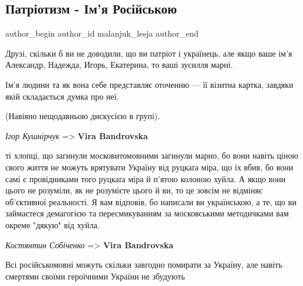  
 
 
 
 
 
\subsection{Патріотизм - Ім'я Російською}
\label{sec:12_10_2019.fb.malanjuk_lesja.1.patriotizm_imja_jazyk}
 
\ifcmt
 author_begin
   author_id malanjuk_lesja
 author_end
\fi

Друзі, скільки б ви не доводили, що ви патріот і українець, але якщо ваше ім'я
Александр, Надежда, Игорь, Екатерина, то ваші зусилля марні.

Ім'я людини та як вона себе представляє оточенню — її візитна картка, завдяки
якій складається думка про неї.

(Навіяно нещодавньою дискусією в групі).


\begin{center}
	\begin{fminipage}{0.9\textwidth}
\color{orange}\large
{\em Ігор Кушнірчук} => {\bfseries Vira Bandrovska}\par

ті хлопці, що загинули московитомовними загинули марно, бо вони навіть ціною
свого життя не можуть врятувати Україну від руцкаґа міра, що їх вбив, бо вони
самі є провідниками того руцкаґа міра й п'ятою колоною хуйла. А якщо вони цього
не розуміли, як не розумієте цього й ви, то це зовсім не відміняє об'єктивної
реальності. Я вам відповів, бо написали ви українською, а те, що ви займаєтеся
демагогією та пересмикуванням за московськими методичками вам окреме "дякую"
від хуйла.

{\em Костянтин Собіченко} => {\bfseries Vira Bandrovska}\par

Всі російськомовні можуть скільки завгодно помирати за Україну, але навіть
смертями своїми героїчними України не збудують

	\end{fminipage}
\end{center}

